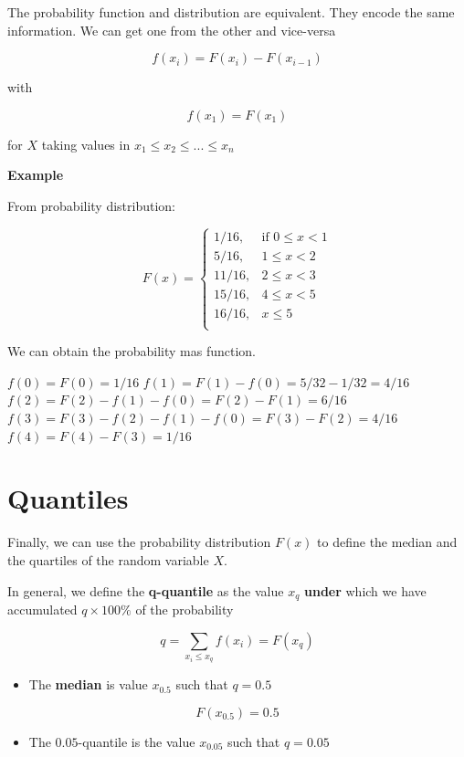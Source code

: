 \documentclass[
]{book}
\providecommand{\tightlist}{%
  \setlength{\itemsep}{0pt}\setlength{\parskip}{0pt}}
\begin{document}
The probability function and distribution are equivalent. They encode the same information. We can get one from the other and vice-versa

\[f(x_i)=F(x_i)-F(x_{i-1})\]

with

\[f(x_1)=F(x_1)\]

for \(X\) taking values in \(x_1 \leq x_2 \leq ... \leq x_n\)

\textbf{Example}

From probability distribution:

\[
    F(x)=
\begin{cases}
    1/16,& \text{if } 0 \leq x < 1\\
    5/16,& 1\leq x < 2\\
    11/16,& 2\leq x < 3\\
    15/16,& 4\leq x < 5\\
    16/16,&  x \leq 5\\
\end{cases}
\]

We can obtain the probability mas function.

\(f(0)=F(0)=1/16\)
\(f(1)=F(1)-f(0)=5/32-1/32=4/16\)
\(f(2)=F(2)-f(1)-f(0)=F(2)-F(1)=6/16\)
\(f(3)=F(3)-f(2)-f(1)-f(0)=F(3)-F(2)=4/16\)
\(f(4)=F(4)-F(3)=1/16\)

\hypertarget{quantiles}{%
\section{Quantiles}\label{quantiles}}

Finally, we can use the probability distribution \(F(x)\) to define the median and the quartiles of the random variable \(X\).

In general, we define the \textbf{q-quantile} as the value \(x_{q}\) \textbf{under} which we have accumulated \(q\times 100\%\) of the probability

\[q=\sum_{x_i\leq x_q} f(x_i) = F (x_q)\]

\begin{itemize}
\tightlist
\item
  The \textbf{median} is value \(x_{0.5}\) such that \(q=0.5\)
\end{itemize}

\[F(x_{0.5})=0.5\]

\begin{itemize}
\tightlist
\item
  The \(0.05\)-quantile is the value \(x_{0.05}\) such that \(q=0.05\)
\end{itemize}
\end{document}
